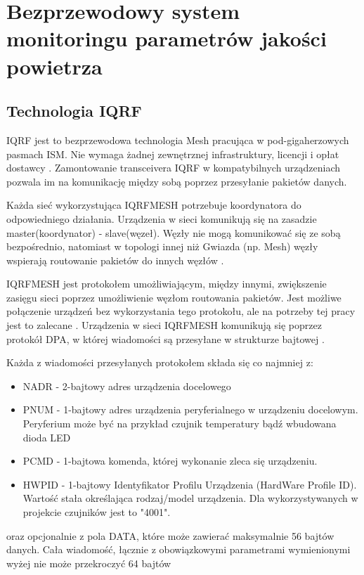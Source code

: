 \section{Bezprzewodowy system monitoringu parametrów jakości powietrza}
\label{system}

\subsection{Technologia IQRF}

IQRF jest to bezprzewodowa technologia Mesh pracująca w pod-gigaherzowych pasmach ISM. Nie wymaga żadnej zewnętrznej infrastruktury, 
licencji i opłat dostawcy \cite{what-iqrf}. Zamontowanie transceivera IQRF w kompatybilnych urządzeniach pozwala im na komunikację między sobą
poprzez przesyłanie pakietów danych. 

Każda sieć wykorzystująca IQRFMESH potrzebuje koordynatora do odpowiedniego działania. Urządzenia w sieci komunikują się na zasadzie
master(koordynator) - slave(węzeł). Węzły nie mogą komunikować się ze sobą bezpośrednio, natomiast w topologi innej niż
Gwiazda (np. Mesh) węzły wspierają routowanie pakietów do innych węzłów \cite{iqrf-rules}.

IQRFMESH jest protokołem umożliwiającym, między innymi, zwiększenie zasięgu sieci poprzez umożliwienie węzłom routowania pakietów.
Jest możliwe połączenie urządzeń bez wykorzystania tego protokołu, ale na potrzeby tej pracy jest to zalecane \cite{iqrfmesh}. Urządzenia w 
sieci IQRFMESH komunikują się poprzez protokół DPA, w której wiadomości są przesyłane w strukturze bajtowej \cite{dpa-guide}.

Każda z wiadomości przesyłanych protokołem składa się co najmniej z:
\begin{itemize}
    \item NADR - 2-bajtowy adres urządzenia docelowego
    \item PNUM - 1-bajtowy adres urządzenia peryferialnego w urządzeniu docelowym. Peryferium może być na przykład czujnik temperatury bądź wbudowana dioda LED
    \item PCMD - 1-bajtowa komenda, której wykonanie zleca się urządzeniu. 
    \item HWPID - 1-bajtowy Identyfikator Profilu Urządzenia (HardWare Profile ID). Wartość stała określająca rodzaj/model urządzenia. Dla wykorzystywanych w projekcie
czujników jest to "4001".
\end{itemize}

oraz opcjonalnie z pola DATA, które może zawierać maksymalnie 56 bajtów danych. Cała wiadomość, łącznie z obowiązkowymi parametrami wymienionymi wyżej nie może przekroczyć
64 bajtów 

